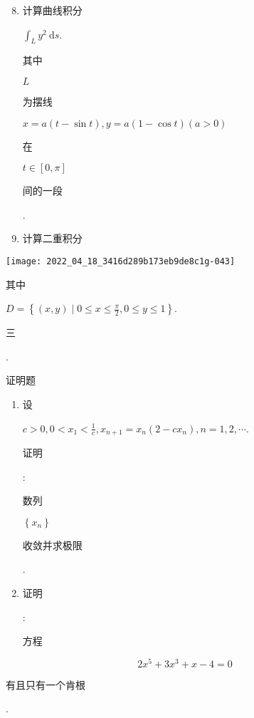 \documentclass[10pt]{article}
\begin{document}
\begin{enumerate}
  \setcounter{enumi}{7}
  \item \begin{CJK}{UTF8}{mj}计算曲线积分\end{CJK} $\int_{L} y^{2} \mathrm{~d} s$. \begin{CJK}{UTF8}{mj}其中\end{CJK} $L$ \begin{CJK}{UTF8}{mj}为摆线\end{CJK} $x=a(t-\sin t), y=a(1-\cos t)(a>0)$ \begin{CJK}{UTF8}{mj}在\end{CJK} $t \in[0, \pi]$ \begin{CJK}{UTF8}{mj}间的一段\end{CJK}.

  \item \begin{CJK}{UTF8}{mj}计算二重积分\end{CJK}

\end{enumerate}
\texttt{[image: 2022\_04\_18\_3416d289b173eb9de8c1g-043]}

\begin{CJK}{UTF8}{mj}其中\end{CJK} $D=\left\{(x, y) \mid 0 \leqslant x \leqslant \frac{\pi}{2}, 0 \leqslant y \leqslant 1\right\}$.

\begin{CJK}{UTF8}{mj}三\end{CJK}. \begin{CJK}{UTF8}{mj}证明题\end{CJK}

\begin{enumerate}
  \item \begin{CJK}{UTF8}{mj}设\end{CJK} $c>0,0<x_{1}<\frac{1}{c}, x_{n+1}=x_{n}\left(2-c x_{n}\right), n=1,2, \cdots$. \begin{CJK}{UTF8}{mj}证明\end{CJK}: \begin{CJK}{UTF8}{mj}数列\end{CJK} $\left\{x_{n}\right\}$ \begin{CJK}{UTF8}{mj}收敛并求极限\end{CJK}.

  \item \begin{CJK}{UTF8}{mj}证明\end{CJK}: \begin{CJK}{UTF8}{mj}方程\end{CJK}

\end{enumerate}
$$
2 x^{5}+3 x^{3}+x-4=0
$$
\begin{CJK}{UTF8}{mj}有且只有一个肯根\end{CJK}.
\end{document}

